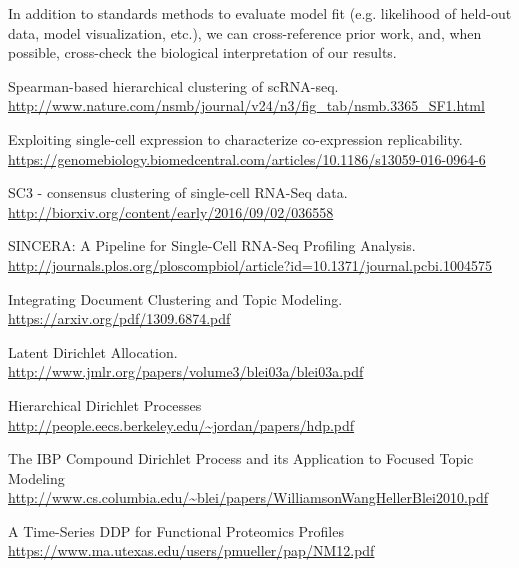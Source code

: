 \documentclass[11pt]{article}
\begin{document}
In addition to standards methods to evaluate model fit (e.g. likelihood of held-out data, model visualization, etc.), we can cross-reference prior work, and, when possible, cross-check the biological interpretation of our results.

\begin{thebibliography}{9}
        Spearman-based hierarchical clustering of scRNA-seq.
        \url{http://www.nature.com/nsmb/journal/v24/n3/fig_tab/nsmb.3365_SF1.html}
         
        Exploiting single-cell expression to characterize co-expression replicability.
        \url{https://genomebiology.biomedcentral.com/articles/10.1186/s13059-016-0964-6}
         
        SC3 - consensus clustering of single-cell RNA-Seq data.
        \url{http://biorxiv.org/content/early/2016/09/02/036558}

        SINCERA: A Pipeline for Single-Cell RNA-Seq Profiling Analysis.
        \url{http://journals.plos.org/ploscompbiol/article?id=10.1371/journal.pcbi.1004575}

        Integrating Document Clustering and Topic Modeling.
        \url{https://arxiv.org/pdf/1309.6874.pdf}

        Latent Dirichlet Allocation.
        \url{http://www.jmlr.org/papers/volume3/blei03a/blei03a.pdf}

        Hierarchical Dirichlet Processes
        \url{http://people.eecs.berkeley.edu/~jordan/papers/hdp.pdf}

        The IBP Compound Dirichlet Process and its Application to Focused Topic Modeling
        \url{http://www.cs.columbia.edu/~blei/papers/WilliamsonWangHellerBlei2010.pdf}

        A Time-Series DDP for Functional Proteomics Profiles
        \url{https://www.ma.utexas.edu/users/pmueller/pap/NM12.pdf}


\end{thebibliography}
\end{document}
